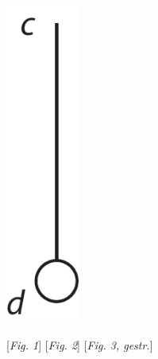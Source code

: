 \begin{minipage}[t]{0.33\textwidth}
\includegraphics[width=0.18\textwidth]{images/62_3.pdf}
\end{minipage}

               \vspace*{1mm}
                    \hspace*{-1,5mm}  [\textit{Fig. 1}]\hspace*{44mm}  [\textit{Fig. 2}] \hspace*{38mm}  [\textit{Fig. 3, gestr.}]
\vspace*{1em}                       
                   
